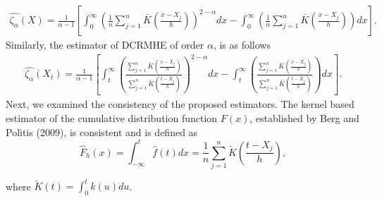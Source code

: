 \documentclass[11pt,reqno]{amsart}
\theoremstyle{tight}
\begin{document}
\begin{align}\label{CRMX hat}
    \widehat  {\zeta_{\alpha}}(X)=\frac{1}{\alpha-1}\left[\int_{0}^{\infty}\left(\frac{1}{n}\sum_{j=1}^{n}\bar{K}\left(\frac{x-X_j}{h}\right)\right)^{2-\alpha}dx-\int_{0}^{\infty}\left(\frac{1}{n}\sum_{j=1}^{n}\bar{K}\left(\frac{x-X_j}{h}\right)\right)dx\right].
\end{align}
Similarly, the estimator of DCRMHE of order $\alpha$, is as follows
\begin{align}\label{CRMt hat}
    \widehat  {\zeta_{\alpha}}(X_t)=\frac{1}{\alpha-1}\left[\int_{t}^{\infty}\left(\frac{\sum_{j=1}^{n}\bar{K}\left(\frac{x-X_j}{h}\right)}{\sum_{j=1}^{n}\bar{K}\left(\frac{t-X_j}{h}\right)}\right)^{2-\alpha}dx-\int_{t}^{\infty}\left(\frac{\sum_{j=1}^{n}\bar{K}\left(\frac{x-X_j}{h}\right)}{\sum_{j=1}^{n}\bar{K}\left(\frac{t-X_j}{h}\right)}\right)dx \right].
\end{align}
Next, we examined the consistency of the proposed estimators. The kernel based estimator of the cumulative distribution function $F(x)$, established by Berg and Politis (2009), is consistent and is defined as
\begin{equation}\label{F hat}
    \widehat{F}_h(x)=\int_{-\infty}^{t}\hat{f}(t)dx=\frac{1}{n}\sum_{j=1}^{n}\tilde{K}\left(\frac{t-X_j}{h}\right),
\end{equation}

where $\tilde{K}(t)=\int_{0}^{t}k(u)du$.\par
\end{document}
